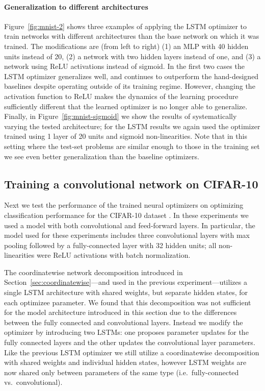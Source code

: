 \paragraph{Generalization to different architectures} Figure~\ref{fig:mnist-2}
shows three examples of applying the LSTM optimizer to train networks with
different architectures than the base network on which it was trained.  The
modifications are (from left to right) (1) an MLP with 40 hidden units instead
of 20, (2) a network with two hidden layers instead of one, and (3) a network
using ReLU activations instead of sigmoid.  In the first two cases the LSTM
optimizer generalizes well, and continues to outperform the hand-designed
baselines despite operating outside of its training regime.  However, changing
the activation function to ReLU makes the dynamics of the learning procedure
sufficiently different that the learned optimizer is no longer able to
generalize. Finally, in Figure~\ref{fig:mnist-sigmoid} we show the results of
systematically varying the tested architecture; for the LSTM results we again
used the optimizer trained using 1 layer of 20 units and sigmoid
non-linearities. Note that in this setting where the test-set problems are
similar enough to those in the training set we see even better generalization
than the baseline optimizers.

\subsection{Training a convolutional network on CIFAR-10}

Next we test the performance of the trained neural optimizers on optimizing
classification performance for the CIFAR-10 dataset \citep{krizhevsky:2009}. In
these experiments we used a model with both convolutional and feed-forward
layers. In particular, the model used for these experiments includes three
convolutional layers with max pooling followed by a fully-connected layer with
32 hidden units; all non-linearities were ReLU activations with batch
normalization.

The coordinatewise network decomposition introduced in
Section~\ref{sec:coordinatewise}---and used in the previous
experiment---utilizes a single LSTM architecture with shared weights, but
separate hidden states, for each optimizee parameter. We found that this
decomposition was not sufficient for the model architecture introduced in this
section due to the differences between the fully connected and convolutional
layers. Instead we modify the optimizer by introducing two LSTMs: one proposes
parameter updates for the fully connected layers and the other updates the
convolutional layer parameters. Like the previous LSTM optimizer we still
utilize a coordinatewise decomposition with shared weights and individual
hidden states, however LSTM weights are now shared only between parameters of
the same type (i.e.\ fully-connected vs.\ convolutional).

